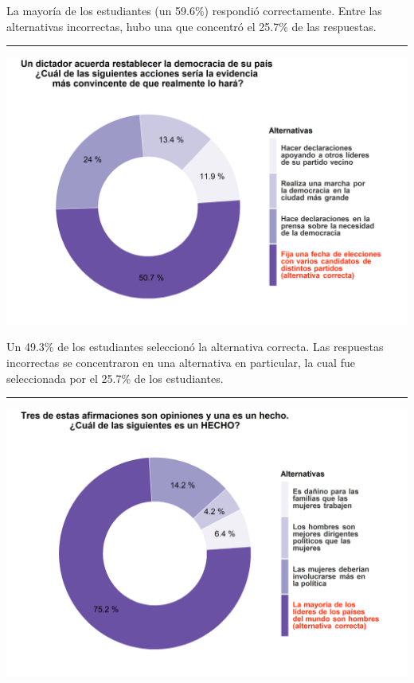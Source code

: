 \documentclass[
  14pt,
]{book}
\let\origfigure\figure
\let\endorigfigure\endfigure
\renewenvironment{figure}[1][2] {
  \expandafter\origfigure\expandafter[H]
} {
  \endorigfigure
}
\begin{document}
La mayoría de los estudiantes (un 59.6\%) respondió correctamente. Entre las alternativas incorrectas, hubo una que concentró el 25.7\% de las respuestas.

\begin{center}\rule{0.5\linewidth}{0.5pt}\end{center}

\begin{figure}[!ht]

{\centering \includegraphics[width=0.8\linewidth,]{images/ccivico_5} 

}

\caption{Acción que demuestra que un dictador restablecerá la democracia}\label{fig:unnamed-chunk-9}
\end{figure}

Un 49.3\% de los estudiantes seleccionó la alternativa correcta. Las respuestas incorrectas se concentraron en una alternativa en particular, la cual fue seleccionada por el 25.7\% de los estudiantes.

\begin{center}\rule{0.5\linewidth}{0.5pt}\end{center}

\begin{figure}[!ht]

{\centering \includegraphics[width=0.8\linewidth,]{images/ccivico_6} 

}

\caption{Afirmación que corresponde a un hecho}\label{fig:unnamed-chunk-10}
\end{figure}
\end{document}
